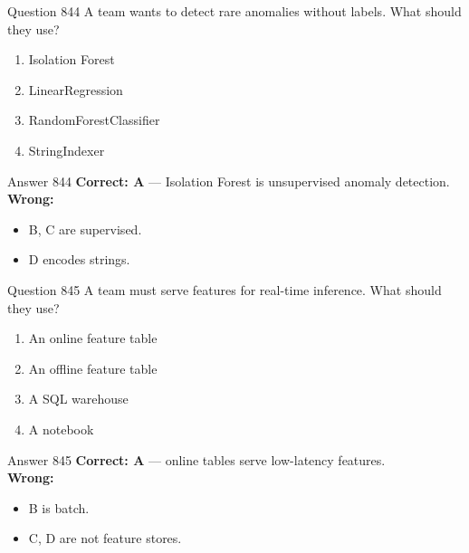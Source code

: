 \documentclass[aspectratio=169,11pt]{beamer}
\begin{document}
	\begin{frame}{Question 844}
		A team wants to detect rare anomalies without labels. What should they use?
		\begin{enumerate}[label=\Alph*.]
			\item Isolation Forest
			\item LinearRegression
			\item RandomForestClassifier
			\item StringIndexer
		\end{enumerate}
	\end{frame}
	\begin{frame}{Answer 844}
		\textbf{Correct: A} --- Isolation Forest is unsupervised anomaly detection.\\
		\vspace{0.5em}
		\textbf{Wrong:}
		\begin{itemize}
			\item B, C are supervised.
			\item D encodes strings.
		\end{itemize}
	\end{frame}
	
	\begin{frame}{Question 845}
		A team must serve features for real-time inference. What should they use?
		\begin{enumerate}[label=\Alph*.]
			\item An online feature table
			\item An offline feature table
			\item A SQL warehouse
			\item A notebook
		\end{enumerate}
	\end{frame}
	\begin{frame}{Answer 845}
		\textbf{Correct: A} --- online tables serve low-latency features.\\
		\vspace{0.5em}
		\textbf{Wrong:}
		\begin{itemize}
			\item B is batch.
			\item C, D are not feature stores.
		\end{itemize}
	\end{frame}
	
\end{document}
